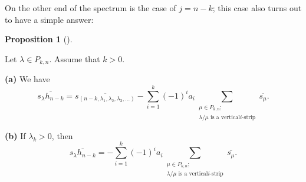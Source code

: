 \documentclass[numbers=enddot,12pt,final,onecolumn,notitlepage]{scrartcl}%
\theoremstyle{definition}
\newtheorem{prop}[theo]{Proposition}
\newenvironment{proposition}[1][]
{\begin{prop}[#1]\begin{leftbar}}
{\end{leftbar}\end{prop}}
\let\sumnonlimits\sum
\renewcommand{\sum}{\sumnonlimits\limits}
\begin{document}
On the other end of the spectrum is the case of $j=n-k$; this case also turns
out to have a simple answer:

\begin{proposition}
\label{prop.pieri-hlast}Let $\lambda\in P_{k,n}$. Assume that $k>0$.

\textbf{(a)} We have%
\[
\overline{s_{\lambda}h_{n-k}}=\overline{s_{\left(  n-k,\lambda_{1},\lambda
_{2},\lambda_{3},\ldots\right)  }}-\sum_{i=1}^{k}\left(  -1\right)  ^{i}%
a_{i}\sum_{\substack{\mu\in P_{k,n};\\\lambda/\mu\text{ is a vertical
}i\text{-strip}}}\overline{s_{\mu}}.
\]


\textbf{(b)} If $\lambda_{k}>0$, then%
\[
\overline{s_{\lambda}h_{n-k}}=-\sum_{i=1}^{k}\left(  -1\right)  ^{i}a_{i}%
\sum_{\substack{\mu\in P_{k,n};\\\lambda/\mu\text{ is a vertical
}i\text{-strip}}}\overline{s_{\mu}}.
\]

\end{proposition}
\end{document}
